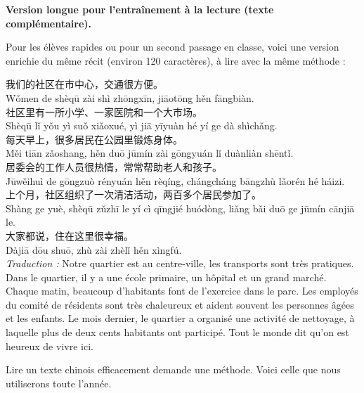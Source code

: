 \documentclass[11pt]{article}
\newcounter{popsec}
\newcounter{popsub}
\newcommand{\courssub}[1]{%
  \stepcounter{popsub}%
  \par\vspace{9pt}\noindent{\popxbold\fontsize{11.5}{13}\selectfont\color{popink}{\color{poporange}\thepopsec.\thepopsub}\hspace{6pt}#1}\par\nopagebreak\vspace{4pt}
}
\begin{document}
\textbf{Version longue pour l'entraînement à la lecture (texte complémentaire).}\par

Pour les élèves rapides ou pour un second passage en classe, voici une version enrichie du même récit (environ 120 caractères), à lire avec la même méthode :

\begin{textebox}
我们的社区在市中心，交通很方便。\\
Wǒmen de shèqū zài shì zhōngxīn, jiāotōng hěn fāngbiàn.\\
社区里有一所小学、一家医院和一个大市场。\\
Shèqū lǐ yǒu yì suǒ xiǎoxué, yì jiā yīyuàn hé yí ge dà shìchǎng.\\
每天早上，很多居民在公园里锻炼身体。\\
Měi tiān zǎoshang, hěn duō jūmín zài gōngyuán lǐ duànliàn shēntǐ.\\
居委会的工作人员很热情，常常帮助老人和孩子。\\
Jūwěihuì de gōngzuò rényuán hěn rèqíng, chángcháng bāngzhù lǎorén hé háizi.\\
上个月，社区组织了一次清洁活动，两百多个居民参加了。\\
Shàng ge yuè, shèqū zǔzhī le yí cì qīngjié huódòng, liǎng bǎi duō ge jūmín cānjiā le.\\
大家都说，住在这里很幸福。\\
Dàjiā dōu shuō, zhù zài zhèlǐ hěn xìngfú.\\[0.5em]
\emph{Traduction :} Notre quartier est au centre-ville, les transports sont très pratiques. Dans le quartier, il y a une école primaire, un hôpital et un grand marché. Chaque matin, beaucoup d'habitants font de l'exercice dans le parc. Les employés du comité de résidents sont très chaleureux et aident souvent les personnes âgées et les enfants. Le mois dernier, le quartier a organisé une activité de nettoyage, à laquelle plus de deux cents habitants ont participé. Tout le monde dit qu'on est heureux de vivre ici.
\end{textebox}

\courssub{La lecture en trois étapes}

Lire un texte chinois efficacement demande une méthode. Voici celle que nous utiliserons toute l'année.
\end{document}
